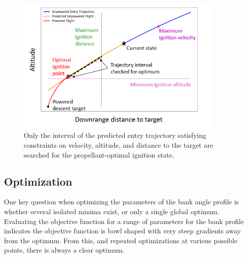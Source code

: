 \documentclass[letterpaper, preprint, paper,11pt]{AAS}
\begin{document}
\begin{figure}[h!]
	\centering
	\includegraphics[width=0.9\textwidth]{H_Vs_S} 
	\caption{Only the interval of the predicted entry trajectory satisfying constraints on velocity, altitude, and distance to the target are searched for the propellant-optimal ignition state.}
	\label{fig_ignition}
\end{figure}


\subsection{Optimization}
%

One key question when optimizing the parameters of the bank angle profile is whether several isolated minima exist, or only a single global optimum. 
Evaluating the objective function for a range of parameters for the bank profile indicates the objective function is bowl shaped with very steep gradients away from the optimum. From this, and repeated optimizations at various possible points, there is always a clear optimum.
\end{document}
